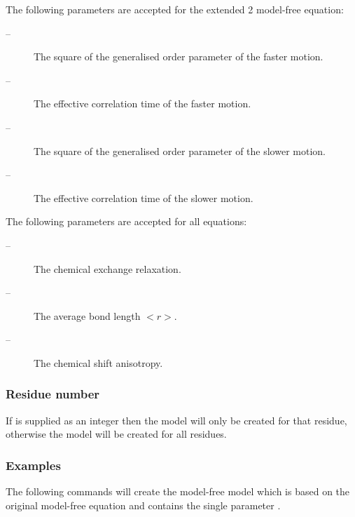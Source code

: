  The following parameters are accepted for the extended 2 model-free equation: 
  

 \begin{description} 
 \item[ --]  The square of the generalised order parameter of the faster motion.  
 \item[ --]   The effective correlation time of the faster motion.  
 \item[ --]  The square of the generalised order parameter of the slower motion.  
 \item[ --]   The effective correlation time of the slower motion.  
 \end{description} 
  

 The following parameters are accepted for all equations: 
  

 \begin{description} 
 \item[ --]  The chemical exchange relaxation.  
 \item[ --]    The average bond length $<$$r$$>$.  
 \item[ --]  The chemical shift anisotropy.  
 \end{description} 
  

  
 \subsubsection{Residue number} 

 If  is supplied as an integer then the model will only be created for that residue, otherwise the model will be created for all residues. 
  

  
 \subsubsection{Examples} 

 The following commands will create the model-free model  which is based on the original model-free equation and contains the single parameter . 
  


